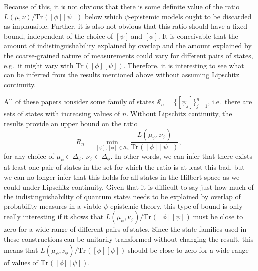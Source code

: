 \documentclass[DIV=calc,paper=a4,fontsize=11pt,twocolumn]{scrartcl} %
\theoremstyle{definition}
\theoremstyle{plain}
\newcommand{\Proj}[1]{\ensuremath{\left [ #1 \right ]}}
\newcommand{\Tr}[2][]{\ensuremath{\text{Tr}_{#1} \left ( #2 \right )}}
\begin{document}
Because of this, it is not obvious that there is some definite value
of the ratio $L(\mu,\nu) / \Tr{\Proj{\phi}\Proj{\psi}}$ below which
$\psi$-epistemic models ought to be discarded as implausible.
Further, it is also not obvious that this ratio should have a fixed
bound, independent of the choice of $\Proj{\psi}$ and $\Proj{\phi}$.
It is conceivable that the amount of indistinguishability explained by
overlap and the amount explained by the coarse-grained nature of
measurements could vary for different pairs of states, e.g.\ it might
vary with $\Tr{\Proj{\phi}\Proj{\psi}}$.  Therefore, it is interesting
to see what can be inferred from the results mentioned above
\cite{Maroney2012, Barrett2013, Leifer2014, Branciard2014} without
assuming Lipschitz continuity.

All of these papers consider some family of states $\mathcal{S}_n =
\{\Proj{\psi_j}\}_{j=1}^n$, i.e.\ there are sets of states with
increasing values of $n$.  Without Lipschitz continuity, the results
provide an upper bound on the ratio
\begin{equation}
R_n = \min_{\Proj{\psi}, \Proj{\phi} \in \mathcal{S}_n}
\frac{L(\mu_{\psi},\nu_{\phi})}{\Tr{\Proj{\phi}\Proj{\psi}}},
\end{equation}
for any choice of $\mu_{\psi} \in \Delta_{\psi}$, $\nu_{\phi} \in
\Delta_{\phi}$.  In other words, we can infer that there exists at
least one pair of states in the set for which the ratio is at least
this bad, but we can no longer infer that this holds for all states in
the Hilbert space as we could under Lipschitz continuity.  Given that
it is difficult to say just how much of the indistinguishability of
quantum states needs to be explained by overlap of probability
measures in a viable $\psi$-epistemic theory, this type of bound is
only really interesting if it shows that
$L(\mu_{\psi},\nu_{\phi})/\Tr{\Proj{\phi}\Proj{\psi}}$ must be close
to zero for a wide range of different pairs of states.  Since the
state families used in these constructions can be unitarily
transformed without changing the result, this means that
$L(\mu_{\psi},\nu_{\phi})/\Tr{\Proj{\phi}\Proj{\psi}}$ should be close
to zero for a wide range of values of $\Tr{\Proj{\phi}\Proj{\psi}}$.
\end{document}
